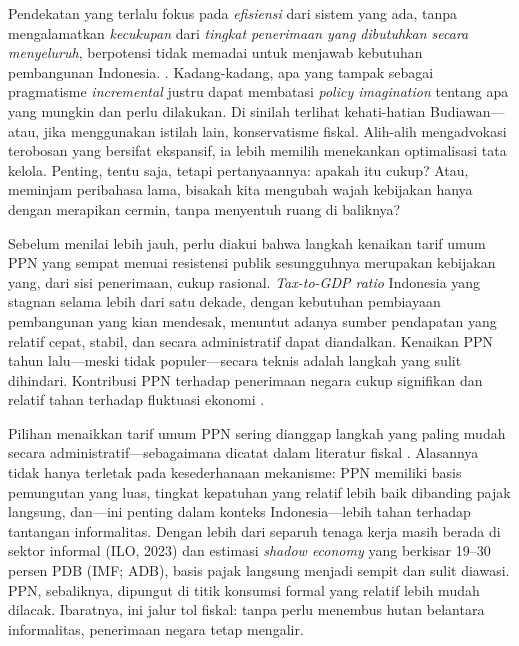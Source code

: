 Pendekatan yang terlalu fokus pada \textit{efisiensi} dari sistem yang ada, tanpa mengalamatkan \textit{kecukupan} dari \textit{tingkat penerimaan yang dibutuhkan secara menyeluruh},  berpotensi tidak memadai untuk menjawab kebutuhan pembangunan Indonesia. . Kadang-kadang, apa yang tampak sebagai pragmatisme \textit{incremental} justru dapat membatasi \textit{policy imagination} tentang apa yang mungkin dan perlu dilakukan. Di sinilah terlihat kehati-hatian Budiawan—atau, jika menggunakan istilah lain, konservatisme fiskal. Alih-alih mengadvokasi terobosan yang bersifat ekspansif, ia lebih memilih menekankan optimalisasi tata kelola. Penting, tentu saja, tetapi pertanyaannya: apakah itu cukup? Atau, meminjam peribahasa lama, bisakah kita mengubah wajah kebijakan hanya dengan merapikan cermin, tanpa menyentuh ruang di baliknya?

Sebelum menilai lebih jauh, perlu diakui bahwa langkah kenaikan tarif umum PPN yang sempat menuai resistensi publik sesungguhnya merupakan kebijakan yang, dari sisi penerimaan, cukup rasional. \textit{Tax-to-GDP ratio} Indonesia yang stagnan selama lebih dari satu dekade, dengan kebutuhan pembiayaan pembangunan yang kian mendesak, menuntut adanya sumber pendapatan yang relatif cepat, stabil, dan secara administratif dapat diandalkan. Kenaikan PPN tahun lalu—meski tidak populer—secara teknis adalah langkah yang sulit dihindari. Kontribusi PPN terhadap penerimaan negara cukup signifikan dan relatif tahan terhadap fluktuasi ekonomi \citep{saptono_2022_institutional,arvin_2021_are}. 

Pilihan menaikkan tarif umum PPN sering dianggap langkah yang paling mudah secara administratif—sebagaimana dicatat dalam literatur fiskal \citep{brautigam_2008_taxation, timmons_2005_the, akanbi_2019_state, addison_2018_fiscal, gaspar_2016_tax, iswahyudi_2021_getting}. Alasannya tidak hanya terletak pada kesederhanaan mekanisme: PPN memiliki basis pemungutan yang luas, tingkat kepatuhan yang relatif lebih baik dibanding pajak langsung, dan—ini penting dalam konteks Indonesia—lebih tahan terhadap tantangan informalitas. Dengan lebih dari separuh tenaga kerja masih berada di sektor informal (ILO, 2023) dan estimasi \textit{shadow economy} yang berkisar 19–30 persen PDB (IMF; ADB), basis pajak langsung menjadi sempit dan sulit diawasi. PPN, sebaliknya, dipungut di titik konsumsi formal yang relatif lebih mudah dilacak. Ibaratnya, ini jalur tol fiskal: tanpa perlu menembus hutan belantara informalitas, penerimaan negara tetap mengalir.  

